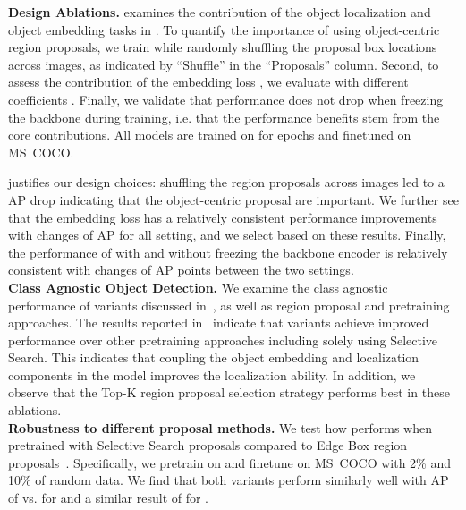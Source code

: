 \noindent\textbf{Design Ablations.}  examines the contribution of the object localization and object embedding tasks in \model. 
To quantify the importance of using object-centric region proposals, we train \model while randomly shuffling the proposal box locations across images, as indicated by ``Shuffle'' in the ``Proposals'' column. Second, to assess the contribution of the embedding loss , we evaluate \model with different coefficients . Finally, we validate that performance does not drop when freezing the backbone during training, i.e. that the performance benefits stem from the core \model contributions. All models are trained on \imagenethundred for  epochs and finetuned on MS~COCO. 

 justifies our design choices: shuffling the region proposals across images led to a  AP drop indicating that the object-centric proposal are important. We further see that the embedding loss  has a relatively consistent performance improvements with changes of  AP for all setting, and we select  based on these results. Finally, the performance of \model with and without freezing the backbone encoder is relatively consistent with changes of  AP points between the two settings.
\vspace{0.1cm}
\\
\noindent\textbf{Class Agnostic Object Detection.} We examine the class agnostic performance of \model variants discussed in~, as well as region proposal and pretraining approaches. The results reported in~ indicate that \model variants achieve improved performance over other pretraining approaches including solely using Selective Search. This indicates that coupling the object embedding and localization components in the \model model improves the localization ability. In addition, we observe that the Top-K region proposal selection strategy performs best in these ablations.
\vspace{0.1cm}
\\
\noindent\textbf{Robustness to different proposal methods.} We test how \model performs when pretrained with Selective Search proposals compared to Edge Box region proposals~\cite{zitnick2014edge}. Specifically, we pretrain \model on \imagenethundred and finetune on MS~COCO with 2\% and 10\% of random data. We find that both variants perform similarly well with AP of  vs.  for  and a similar result of  for .
\vspace{0.1cm}
\\
